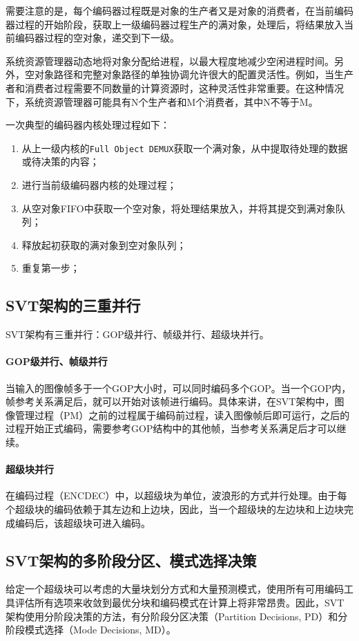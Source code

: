   需要注意的是，每个编码器过程既是对象的生产者又是对象的消费者，在当前编码器过程的开始阶段，获取上一级编码器过程生产的满对象，处理后，将结果放入当前编码器过程的空对象，递交到下一级。

  系统资源管理器动态地将对象分配给进程，以最大程度地减少空闲进程时间。另外，空对象路径和完整对象路径的单独协调允许很大的配置灵活性。例如，当生产者和消费者过程需要不同数量的计算资源时，这种灵活性非常重要。在这种情况下，系统资源管理器可能具有N个生产者和M个消费者，其中N不等于M。

  一次典型的编码器内核处理过程如下：
  \begin{enumerate} [label=\arabic*)]
    \item 从上一级内核的\texttt{Full Object DEMUX}获取一个满对象，从中提取待处理的数据或待决策的内容；
    \item 进行当前级编码器内核的处理过程；
    \item 从空对象FIFO中获取一个空对象，将处理结果放入，并将其提交到满对象队列；
    \item 释放起初获取的满对象到空对象队列；
    \item 重复第一步；
  \end{enumerate}

  \subsection{SVT架构的三重并行}
  SVT架构有三重并行：GOP级并行、帧级并行、超级块并行。
  \paragraph{GOP级并行、帧级并行} 当输入的图像帧多于一个GOP大小时，可以同时编码多个GOP。当一个GOP内，帧参考关系满足后，就可以开始对该帧进行编码。具体来讲，在SVT架构中，图像管理过程（PM）之前的过程属于编码前过程，读入图像帧后即可运行，之后的过程开始正式编码，需要参考GOP结构中的其他帧，当参考关系满足后才可以继续。
  \paragraph{超级块并行} 在编码过程（ENCDEC）中，以超级块为单位，波浪形的方式并行处理。由于每个超级块的编码依赖于其左边和上边块，因此，当一个超级块的左边块和上边块完成编码后，该超级块可进入编码。

  \subsection{SVT架构的多阶段分区、模式选择决策} \label{sec:pd-md}
  给定一个超级块可以考虑的大量块划分方式和大量预测模式，使用所有可用编码工具评估所有选项来收敛到最优分块和编码模式在计算上将非常昂贵。因此，SVT架构使用分阶段决策的方法，有分阶段分区决策（Partition Decisions, PD）和分阶段模式选择（Mode Decisions, MD）。

